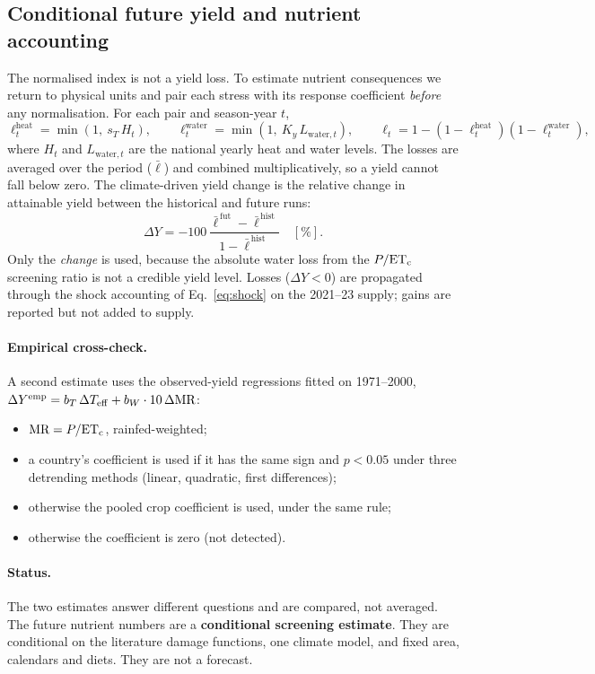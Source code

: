 \subsection{Conditional future yield and nutrient accounting}\label{sec:futureyield}
The normalised index is not a yield loss. To estimate nutrient consequences we return to physical units and pair
each stress with its response coefficient \emph{before} any normalisation. For each pair and season-year $t$,
\begin{equation}\label{eq:loss}
\ell^{\text{heat}}_t = \min\!\left(1,\ s_T\,H_t\right),\qquad
\ell^{\text{water}}_t = \min\!\left(1,\ K_y\,L_{\text{water},t}\right),\qquad
\ell_t = 1-(1-\ell^{\text{heat}}_t)(1-\ell^{\text{water}}_t),
\end{equation}
where $H_t$ and $L_{\text{water},t}$ are the national yearly heat and water levels. The losses are averaged over the
period ($\bar\ell$) and combined multiplicatively, so a yield cannot fall below zero. The climate-driven yield
change is the relative change in attainable yield between the historical and future runs:
\begin{equation}\label{eq:dy}
\Delta Y = -100\,\frac{\bar\ell^{\,\text{fut}}-\bar\ell^{\,\text{hist}}}{1-\bar\ell^{\,\text{hist}}}\quad[\%].
\end{equation}
Only the \emph{change} is used, because the absolute water loss from the $P/\mathrm{ET_c}$ screening ratio is not a
credible yield level. Losses ($\Delta Y<0$) are propagated through the shock accounting of
Eq.~\ref{eq:shock} on the 2021--23 supply; gains are reported but not added to supply.

\paragraph{Empirical cross-check.} A second estimate uses the observed-yield regressions fitted on 1971--2000,
$\Delta Y^{\text{emp}} = b_T\,\Delta T_{\mathrm{eff}} + b_W\cdot10\,\Delta\text{MR}$:
\begin{itemize}
\item $\text{MR}=P/\mathrm{ET_c}$, rainfed-weighted;
\item a country's coefficient is used if it has the same sign and $p<0.05$ under three detrending methods
(linear, quadratic, first differences);
\item otherwise the pooled crop coefficient is used, under the same rule;
\item otherwise the coefficient is zero (not detected).
\end{itemize}

\paragraph{Status.} The two estimates answer different questions and are compared, not averaged. The future
nutrient numbers are a \textbf{conditional screening estimate}. They are conditional on the literature damage
functions, one climate model, and fixed area, calendars and diets. They are not a forecast.
